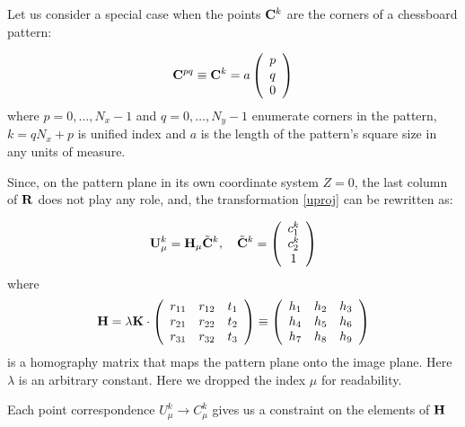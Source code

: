\documentclass[a4paper,10pt]{article}
\begin{document}
Let us consider a special case when the points ${\bf C}^k$ are the corners of a chessboard pattern:

\begin{equation}
 {\bf C}^{pq}\equiv {\bf C}^k= a\left(\begin{array}{c}
                  p \\
                  q \\
                  0
                 \end{array}
\right)
\end{equation}
where $p=0,\ldots, N_x-1$ and $q=0,\ldots,N_y-1$ enumerate corners in the pattern, $k = qN_x + p$ is unified index and $a$ is the length of the pattern's square size in any units of measure.

Since, on the pattern plane in its own coordinate system $Z=0$, the last column of ${\bf R}$ does not play any role, and, the transformation \eqref{uproj} can be rewritten as:

\begin{equation}
 {\bf U}^k_\mu = {\bf H}_\mu {\tilde{\bf  C}}^k, \quad {\tilde{\bf  C}}^k = \left(\begin{array}{c}
c^k_1 \\                                                                               
c^k_2 \\
1
\end{array}
\right)
\end{equation}
where
\begin{equation}
 {\bf H} = \lambda {\bf K}\cdot\left(
 \begin{array}{ccc}
  r_{11} & r_{12} & t_1 \\
  r_{21} & r_{22} & t_2 \\
  r_{31} & r_{32} & t_3 \\
 \end{array}
 \right)\equiv\left(
 \begin{array}{ccc}
  h_{1} & h_{2} & h_3 \\
  h_{4} & h_{5} & h_6 \\
  h_{7} & h_{8} & h_9 \\
 \end{array}
 \right) 
 \label{homography}
\end{equation}
is a homography matrix that maps the pattern plane onto the image plane. Here $\lambda$ is an arbitrary constant. Here we dropped the index $\mu$ for readability.

Each point correspondence $U^k_\mu\to C^k_\mu$ gives us a constraint on the elements of ${\bf H}$
\end{document}
